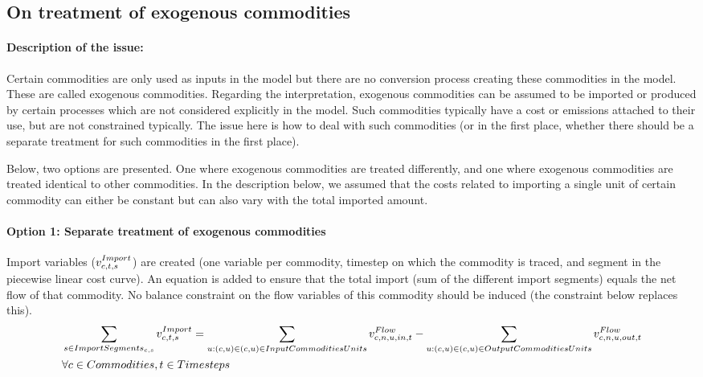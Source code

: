 

\subsection{On treatment of exogenous commodities} \label{subsec:exogenous_commodities}



\paragraph{Description of the issue:}
Certain commodities are only used as inputs in the model but there are no conversion process creating these commodities in the model. These are called exogenous commodities. Regarding the interpretation, exogenous commodities can be assumed to be imported or produced by certain processes which are not considered explicitly in the model. Such commodities typically have a cost or emissions attached to their use, but are not constrained typically. The issue here is how to deal with such commodities (or in the first place, whether there should be a separate treatment for such commodities in the first place).

Below, two options are presented. One where exogenous commodities are treated differently, and one where exogenous commodities are treated identical to other commodities.  In the description below, we assumed that the costs related to importing a single unit of certain commodity can either be constant but can also vary with the total imported amount. 

\paragraph{Option 1: Separate treatment of exogenous commodities}
Import variables ($\vImport$) are created (one variable per commodity, timestep on which the commodity is traced, and segment in the piecewise linear cost curve). An equation is added to ensure that the total import (sum of the different import segments) equals the net flow of that commodity. No balance constraint on the flow variables of this commodity should be induced (the constraint below replaces this). 
\begin{align}
&\sum_{\segment \in \ImportSegments} \vImport =  \sum_{\unit: (\commodity,\unit) \in \InputCommoditiesUnits} \vFlow[\commodity,\node, \unit,in,\timestep]  - \sum_{\unit: (\commodity,\unit) \in \OutputCommoditiesUnits} \vFlow[\commodity,\node,\unit,out,\timestep]  \nonumber \\
& \forall \commodities, \timesteps
\end{align}

